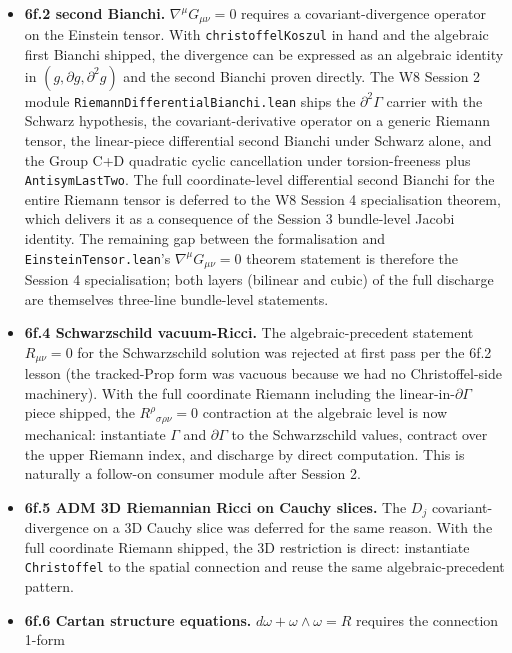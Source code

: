 \documentclass[twocolumn]{revtex4-2}
\newcommand{\Christoffel}{\Gamma}
\newcommand{\MetricMatrix}{g}
\newcommand{\Riem}{R}
\newcommand{\PartG}{\partial g}
\begin{document}
\begin{itemize}
\item \textbf{6f.2 second Bianchi.}
  $\nabla^{\mu}G_{\mu\nu} = 0$ requires a covariant-divergence
  operator on the Einstein tensor. With \texttt{christoffelKoszul} in
  hand and the algebraic first Bianchi shipped, the divergence can
  be expressed as an algebraic identity in
  $(\MetricMatrix,\PartG,\partial^{2}\MetricMatrix)$ and the second
  Bianchi proven directly. The W8 Session 2 module
  \texttt{RiemannDifferentialBianchi.lean} ships the
  $\partial^{2}\Christoffel$ carrier with the Schwarz hypothesis, the
  covariant-derivative operator on a generic Riemann tensor, the
  linear-piece differential second Bianchi under Schwarz alone, and
  the Group C+D quadratic cyclic cancellation under torsion-freeness
  plus \texttt{AntisymLastTwo}. The full coordinate-level differential
  second Bianchi for the entire Riemann tensor is deferred to the W8
  Session 4 specialisation theorem, which delivers it as a consequence
  of the Session 3 bundle-level Jacobi identity. The remaining gap
  between the formalisation and \texttt{EinsteinTensor.lean}'s
  $\nabla^{\mu}G_{\mu\nu}=0$ theorem statement is therefore the
  Session 4 specialisation; both layers (bilinear and cubic) of the
  full discharge are themselves three-line bundle-level statements.
\item \textbf{6f.4 Schwarzschild vacuum-Ricci.}
  The algebraic-precedent statement $R_{\mu\nu} = 0$ for the
  Schwarzschild solution was rejected at first pass per the
  6f.2 lesson (the tracked-Prop form was vacuous because we had no
  Christoffel-side machinery). With the full coordinate Riemann
  including the linear-in-$\partial\Christoffel$ piece shipped, the
  $\Riem^{\rho}{}_{\sigma\rho\nu} = 0$ contraction at the algebraic
  level is now mechanical: instantiate $\Christoffel$ and
  $\partial\Christoffel$ to the Schwarzschild values, contract over
  the upper Riemann index, and discharge by direct computation. This
  is naturally a follow-on consumer module after Session 2.
\item \textbf{6f.5 ADM 3D Riemannian Ricci on Cauchy slices.}
  The $D_{j}$ covariant-divergence on a 3D Cauchy slice was deferred
  for the same reason. With the full coordinate Riemann shipped,
  the 3D restriction is direct: instantiate \texttt{Christoffel} to
  the spatial connection and reuse the same algebraic-precedent
  pattern.
\item \textbf{6f.6 Cartan structure equations.}
  $d\omega + \omega \wedge \omega = R$ requires the connection 1-form

\end{itemize}
\end{document}
